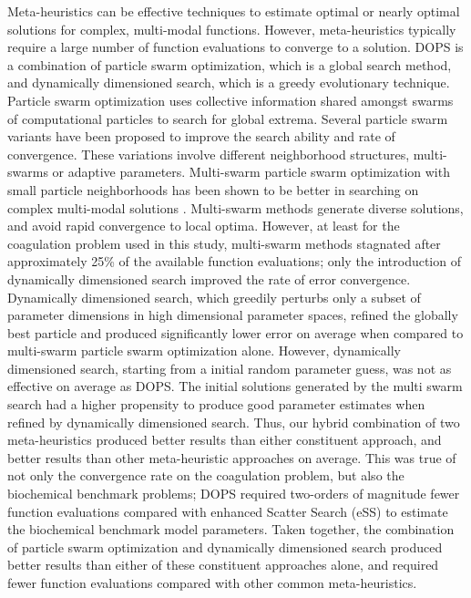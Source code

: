 \documentclass[12pt]{article}
\begin{document}
Meta-heuristics can be effective techniques to estimate optimal or nearly optimal solutions for complex, multi-modal functions.
However, meta-heuristics typically require a large number of function evaluations to converge to a solution.
DOPS is a combination of particle swarm optimization, which is a global search method, and dynamically dimensioned search, which is a greedy evolutionary technique.
Particle swarm optimization uses collective information shared amongst swarms of computational particles to
search for global extrema. Several particle swarm variants have been proposed to improve the search ability and rate of convergence.
These variations involve different neighborhood structures, multi-swarms or adaptive parameters.
Multi-swarm particle swarm optimization with small particle neighborhoods has been shown to be better in searching on complex multi-modal solutions \cite{zhao2008dynamic}.
Multi-swarm methods generate diverse solutions, and avoid rapid convergence to local optima.
However, at least for the coagulation problem used in this study, multi-swarm methods stagnated after approximately 25\% of the available function evaluations; only the introduction of dynamically dimensioned search improved the rate of error convergence.
Dynamically dimensioned search, which greedily perturbs only a subset of parameter dimensions in high dimensional parameter spaces,
refined the globally best particle and produced significantly lower error on average when compared to multi-swarm particle swarm optimization alone.
However, dynamically dimensioned search, starting from a initial random parameter guess, was not as effective on average as DOPS.
The initial solutions generated by the multi swarm search had a higher propensity to produce good parameter estimates when refined by dynamically dimensioned search.
Thus, our hybrid combination of two meta-heuristics produced better results than either constituent approach, and better results than other meta-heuristic approaches on average.
This was true of not only the convergence rate on the coagulation problem, but also the biochemical benchmark problems;
DOPS required two-orders of magnitude fewer function evaluations compared with enhanced Scatter Search (eSS) to estimate the biochemical benchmark model parameters.
Taken together, the combination of particle swarm optimization and dynamically dimensioned search produced better results than either of these constituent approaches alone,
and required fewer function evaluations compared with other common meta-heuristics.
\end{document}
